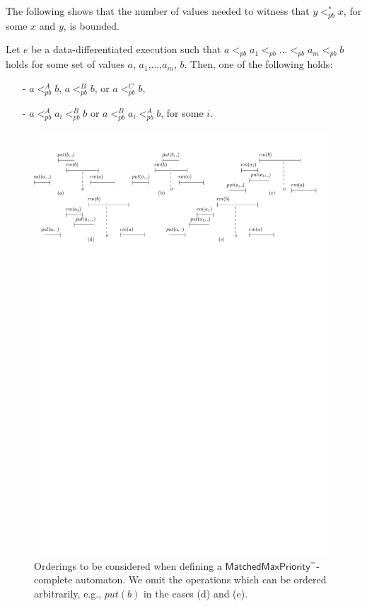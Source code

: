 The following shows that the number of values needed to witness that $y <_{\textit{pb}}^* x$, for some $x$ and $y$, is bounded.

\begin{lemma}
\label{lemma:ob order has bounded length}
Let $e$ be a data-differentiated execution such that $a <_{\textit{pb}} a_1 <_{\textit{pb}} \ldots <_{\textit{pb}} a_m <_{\textit{pb}} b$ holds for some set of values $a$, $a_1$,$\ldots$,$a_m$, $b$. Then, one of the following holds:
\begin{itemize}
\item[-] $a <_{\textit{pb}}^A b$, $a <_{\textit{pb}}^B b$, or $a <_{\textit{pb}}^C b$,

\item[-] $a <_{\textit{pb}}^A a_i <_{\textit{pb}}^B b$ or $a <_{\textit{pb}}^B a_i <_{\textit{pb}}^A b$, for some $i$.
\end{itemize}
\end{lemma}

\begin{figure}[t]
  \centering
  \includegraphics[width=0.8 \textwidth]{figures/PIC-HIS-FiveEnumerations.pdf}
  \caption{Orderings to be considered when defining a $\mathsf{MatchedMaxPriority}^=$-complete automaton. We omit the operations which can be ordered arbitrarily, e.g., $\textit{put}(b)$ in the cases (d) and (e).}
  \label{fig:five enumerations}
\end{figure}

